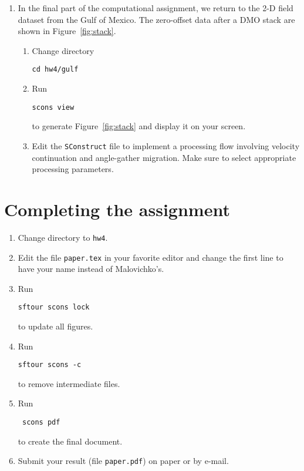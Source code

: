 \begin{enumerate}
\lstset{language=python,numbers=left,numberstyle=\tiny,showstringspaces=false}


\lstset{language=c,numbers=left,numberstyle=\tiny,showstringspaces=false}


\item In the final part of the computational assignment, we return to the 2-D field dataset from the Gulf of Mexico.
The zero-offset data after a DMO stack are shown in Figure~\ref{fig:stack}.


\begin{enumerate}
\item Change directory 
\begin{verbatim}
cd hw4/gulf
\end{verbatim}
\item Run
\begin{verbatim}
scons view
\end{verbatim}
to generate Figure~\ref{fig:stack} and display it on your screen.
\item Edit the \texttt{SConstruct} file to implement a processing flow involving velocity continuation and 
angle-gather migration. Make sure to select appropriate processing parameters.
\end{enumerate}

\lstset{language=python,numbers=left,numberstyle=\tiny,showstringspaces=false}


\end{enumerate}

\newpage

\section{Completing the assignment}

\begin{enumerate}
\item Change directory to \verb#hw4#.
\item Edit the file \texttt{paper.tex} in your favorite editor and change the
  first line to have your name instead of Malovichko's.
\item Run
\begin{verbatim}
sftour scons lock
\end{verbatim}
to update all figures.
\item Run
\begin{verbatim}
sftour scons -c
\end{verbatim}
to remove intermediate files.
\item Run
 \begin{verbatim} 
 scons pdf
\end{verbatim}
  to create the final document.
\item Submit your result (file \texttt{paper.pdf}) on paper or by
  e-mail. 
\end{enumerate}
